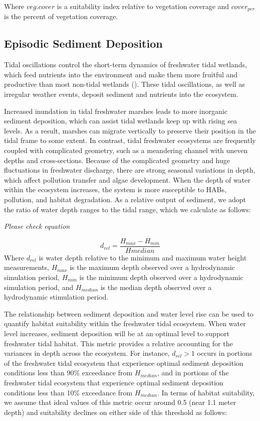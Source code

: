\documentclass[
]{book}
\begin{document}
Where \(veg.cover\) is a suitability index relative to vegetation coverage and \(cover_{per}\) is the percent of vegetation coverage.

\hypertarget{episodic-sediment-deposition}{%
\subsection{Episodic Sediment Deposition}\label{episodic-sediment-deposition}}

Tidal oscillations control the short-term dynamics of freshwater tidal wetlands, which feed nutrients into the environment and make them more fruitful and productive than most non-tidal wetlands (\citet{propato_evaluating_2018}). These tidal oscillations, as well as irregular weather events, deposit sediment and nutrients into the ecosystem.

Increased inundation in tidal freshwater marshes leads to more inorganic sediment deposition, which can assist tidal wetlands keep up with rising sea levels. As a result, marshes can migrate vertically to preserve their position in the tidal frame to some extent. In contrast, tidal freshwater ecosystems are frequently coupled with complicated geometry, such as a meandering channel with uneven depths and cross-sections. Because of the complicated geometry and huge fluctuations in freshwater discharge, there are strong seasonal variations in depth, which affect pollution transfer and algae development. When the depth of water within the ecosystem increases, the system is more susceptible to HABs, pollution, and habitat degradation. As a relative output of sediment, we adopt the ratio of water depth ranges to the tidal range, which we calculate as follows:

\emph{Please check equation}

\[d_{rel} = \frac{H_{max} - H_{min}}{Hmedian}\]
Where \(d_{rel}\) is water depth relative to the minimum and maximum water height measurements, \(H_{max}\) is the maximum depth observed over a hydrodynamic simulation period, \(H_{min}\) is the minimum depth observed over a hydrodynamic simulation period, and \(H_{median}\) is the median depth observed over a hydrodynamic stimulation period.

The relationship between sediment deposition and water level rise can be used to quantify habitat suitability within the freshwater tidal ecosystem. When water level increases, sediment deposition will be at an optimal level to support freshwater tidal habitat. This metric provides a relative accounting for the variances in depth across the ecosystem. For instance, \(d_{rel}>1\) occurs in portions of the freshwater tidal ecosystem that experience optimal sediment deposition conditions less than 90\% exceedance from \(H_{median}\), and in portions of the freshwater tidal ecosystem that experience optimal sediment deposition conditions less than 10\% exceedance from \(H_{median}\). In terms of habitat suitability, we assume that ideal values of this metric occur around 0.5 (near 1.1 meter depth) and suitability declines on either side of this threshold as follows:
\end{document}
